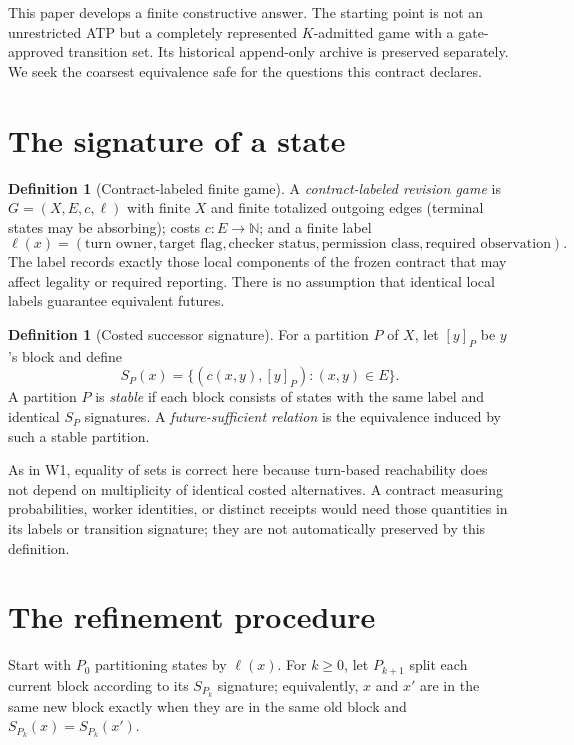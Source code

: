 \documentclass[11pt,letterpaper]{article}
\theoremstyle{definition}
\newtheorem{definition}[theorem]{Definition}
\theoremstyle{remark}
\newcommand{\N}{\mathbb{N}}
\begin{document}
This paper develops a finite constructive answer. The starting point is not an unrestricted ATP but a completely represented $K$-admitted game with a gate-approved transition set. Its historical append-only archive is preserved separately. We seek the coarsest equivalence safe for the questions this contract declares.

\section{The signature of a state}
\begin{definition}[Contract-labeled finite game]
A \emph{contract-labeled revision game} is $G=(X,E,c,\ell)$ with finite $X$ and finite totalized outgoing edges (terminal states may be absorbing); costs $c:E\to\N$; and a finite label
\[
 \ell(x)=(\text{turn owner},\text{target flag},\text{checker status},\text{permission class},\text{required observation}).
\]
The label records exactly those local components of the frozen contract that may affect legality or required reporting. There is no assumption that identical local labels guarantee equivalent futures.
\end{definition}

\begin{definition}[Costed successor signature]
For a partition $P$ of $X$, let $[y]_P$ be $y$'s block and define
\[
  S_P(x)=\big\{(c(x,y),[y]_P):(x,y)\in E\big\}.
\]
A partition $P$ is \emph{stable} if each block consists of states with the same label and identical $S_P$ signatures. A \emph{future-sufficient relation} is the equivalence induced by such a stable partition.
\end{definition}

As in W1, equality of sets is correct here because turn-based reachability does not depend on multiplicity of identical costed alternatives. A contract measuring probabilities, worker identities, or distinct receipts would need those quantities in its labels or transition signature; they are not automatically preserved by this definition.

\section{The refinement procedure}
Start with $P_0$ partitioning states by $\ell(x)$. For $k\ge0$, let $P_{k+1}$ split each current block according to its $S_{P_k}$ signature; equivalently, $x$ and $x'$ are in the same new block exactly when they are in the same old block and $S_{P_k}(x)=S_{P_k}(x')$.
\end{document}
